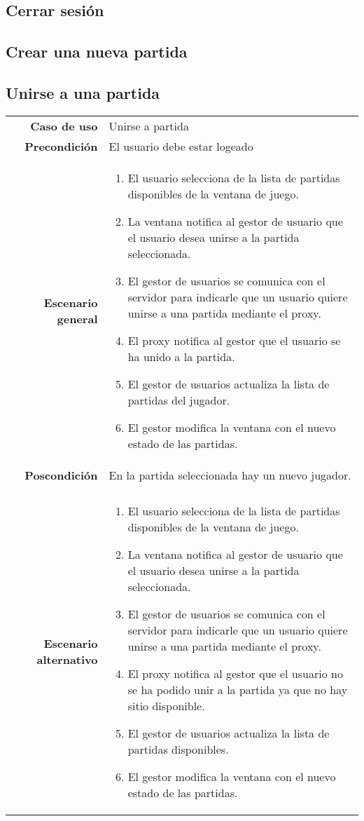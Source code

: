 \subsection{Cerrar sesión}

\subsection{Crear una nueva partida}

\subsection{Unirse a una partida}
{\footnotesize
\begin{tabularx}{0.95\textwidth}{r|X}

\textbf{Caso de uso} & Unirse a partida \\

\textbf{Precondición} & El usuario debe estar logeado \\

\textbf{Escenario general} & \begin{enumerate}
\item El usuario selecciona de la lista de partidas disponibles de la ventana de juego.
\item La ventana notifica al gestor de usuario que el usuario desea unirse a la partida seleccionada.
\item El gestor de usuarios se comunica con el servidor para indicarle que un usuario quiere unirse a una partida mediante el proxy.
\item El proxy notifica al gestor que el usuario se ha unido a la partida.
\item El gestor de usuarios actualiza la lista de partidas del jugador.
\item El gestor modifica la ventana con el nuevo estado de las partidas. 
\end{enumerate} \\

\textbf{Poscondición} & En la partida seleccionada hay un nuevo jugador.\\ \\

\textbf{Escenario alternativo} & \begin{enumerate}
\item El usuario selecciona de la lista de partidas disponibles de la ventana de juego.
\item La ventana notifica al gestor de usuario que el usuario desea unirse a la partida seleccionada.
\item El gestor de usuarios se comunica con el servidor para indicarle que un usuario quiere unirse a una partida mediante el proxy.
\item El proxy notifica al gestor que el usuario no se ha podido unir a la partida ya que no hay sitio disponible.
\item El gestor de usuarios actualiza la lista de partidas disponibles.
\item El gestor modifica la ventana con el nuevo estado de las partidas. 
\end{enumerate}

\end{tabularx}
}

